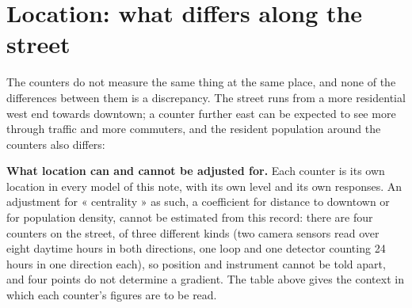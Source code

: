 \documentclass[11pt,a4paper]{article}
\begin{document}
\section{Location: what differs along the street}\label{sec:location}
The counters do not measure the same thing at the same place, and none of the differences between them is a discrepancy. The street runs from a more residential west end towards downtown; a counter further east can be expected to see more through traffic and more commuters, and the resident population around the counters also differs:
\begin{center}\footnotesize{}\end{center}
\textbf{What location can and cannot be adjusted for.} Each counter is its own location in every model of this note, with its own level and its own responses. An adjustment for « centrality » as such, a coefficient for distance to downtown or for population density, cannot be estimated from this record: there are four counters on the street, of three different kinds (two camera sensors read over eight daytime hours in both directions, one loop and one detector counting 24 hours in one direction each), so position and instrument cannot be told apart, and four points do not determine a gradient. The table above gives the context in which each counter\textquoteright{}s figures are to be read.
\end{document}
